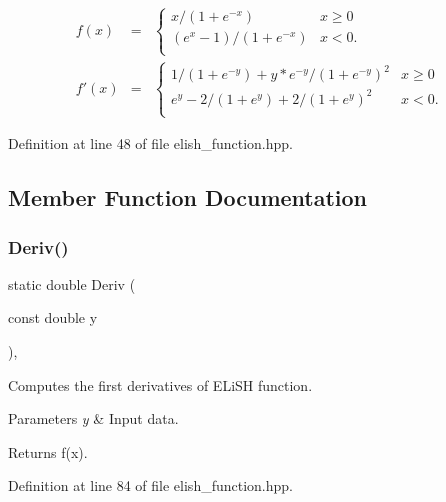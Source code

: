 \begin{eqnarray*} f(x) &=& \begin{cases} x / (1 + e^{-x}) & x \geq 0\\ (e^{x} - 1) / (1 + e^{-x}) & x < 0.\\ \end{cases} \\ f'(x) &=& \begin{cases} 1 / (1 + e^{-y}) + y * e^{-y} / (1 + e^{-y})^2 & x \geq 0\\ e^y - 2 / (1 + e^y) + 2 / (1 + e^y)^2 & x < 0.\\ \end{cases} \end{eqnarray*} 

Definition at line 48 of file elish\+\_\+function.\+hpp.



\subsection{Member Function Documentation}
\mbox{\label{classmlpack_1_1ann_1_1ElishFunction_a163d34fd09f8edf457164f5033c635cf}} 
\subsubsection{Deriv()\hspace{0.1cm}{\footnotesize\ttfamily [1/2]}}
{\footnotesize\ttfamily static double Deriv (\begin{DoxyParamCaption}\item[{const double}]{y }\end{DoxyParamCaption})\hspace{0.3cm}{\ttfamily [inline]}, {\ttfamily [static]}}



Computes the first derivatives of E\+Li\+SH function. 


\begin{DoxyParams}{Parameters}
{\em y} & Input data. \\
\hline
\end{DoxyParams}
\begin{DoxyReturn}{Returns}
f\textquotesingle{}(x). 
\end{DoxyReturn}


Definition at line 84 of file elish\+\_\+function.\+hpp.

